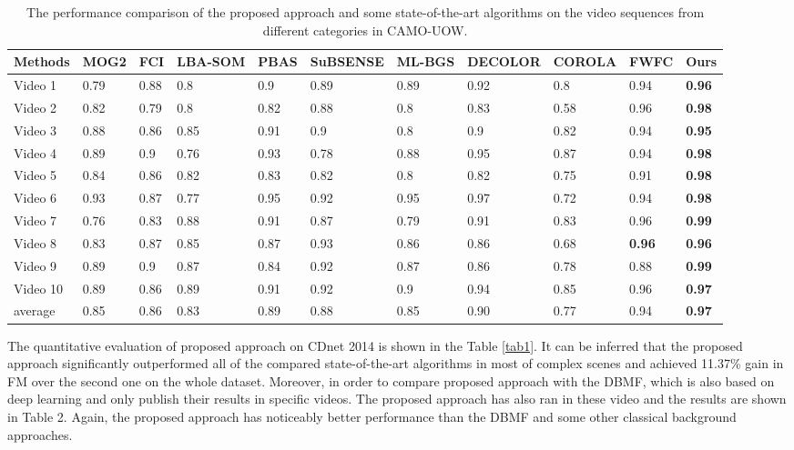 \documentclass[journal]{IEEEtran}
\newcommand{\reftab}[1]{Table \ref{#1}}
\begin{document}
    
    \begin{table}[!t]
\centering
\caption{The performance comparison of the proposed approach and some state-of-the-art algorithms on the video sequences from different categories in CAMO-UOW.}
\label{tab3}
\begin{tabular}{lllllllllll}
\hline
Methods  & MOG2\cite{ZIVKOVIC2006773} & FCI\cite{Baf2008FCI}  & LBA-SOM\cite{LBA-SOM2008} & PBAS & SuBSENSE & ML-BGS\cite{ML-BGS2007} & DECOLOR\cite{DECOLOR2013}       & COROLA\cite{SHAKERI201628} & FWFC\cite{Li2018CAMO}          & Ours          \\ \hline
Video 1  & 0.79 & 0.88 & 0.8     & 0.9  & 0.89     & 0.89   & 0.92          & 0.8    & 0.94 & \textbf{0.96} \\
Video 2  & 0.82 & 0.79 & 0.8     & 0.82 & 0.88     & 0.8    & 0.83          & 0.58   & 0.96          & \textbf{0.98} \\
Video 3  & 0.88 & 0.86 & 0.85    & 0.91 & 0.9      & 0.8    & 0.9           & 0.82   & 0.94 & \textbf{0.95} \\
Video 4  & 0.89 & 0.9  & 0.76    & 0.93 & 0.78     & 0.88   & 0.95          & 0.87   & 0.94          & \textbf{0.98} \\
Video 5  & 0.84 & 0.86 & 0.82    & 0.83 & 0.82     & 0.8    & 0.82          & 0.75   & 0.91          & \textbf{0.98} \\
Video 6  & 0.93 & 0.87 & 0.77    & 0.95 & 0.92     & 0.95   & 0.97	      & 0.72   & 0.94          & \textbf{0.98}  \\
Video 7  & 0.76 & 0.83 & 0.88    & 0.91 & 0.87     & 0.79   & 0.91          & 0.83   & 0.96          & \textbf{0.99} \\
Video 8  & 0.83 & 0.87 & 0.85    & 0.87 & 0.93     & 0.86   & 0.86          & 0.68   & \textbf{0.96}          & \textbf{0.96} \\
Video 9  & 0.89 & 0.9  & 0.87    & 0.84 & 0.92     & 0.87   & 0.86          & 0.78   & 0.88          & \textbf{0.99} \\
Video 10 & 0.89 & 0.86 & 0.89    & 0.91 & 0.92     & 0.9    & 0.94          & 0.85   & 0.96          & \textbf{0.97} \\ \hline
average  & 0.85 & 0.86 & 0.83    & 0.89 & 0.88     & 0.85   & 0.90          & 0.77   & 0.94          & \textbf{0.97} \\ \hline
\end{tabular}
\end{table}




The quantitative evaluation of proposed approach on CDnet 2014 is shown in the \reftab{tab1}. 
It can be inferred that the proposed approach significantly outperformed all of the compared state-of-the-art algorithms in most of complex scenes and achieved 11.37\% gain in FM over the second one on the whole dataset. 
Moreover, in order to compare proposed approach with the DBMF, which is also based on deep learning and only publish their results in  specific videos. 
The proposed approach has also ran in these video and the results are shown in Table 2. 
Again, the proposed approach has noticeably better performance than the DBMF and some other classical background approaches.
\end{document}
